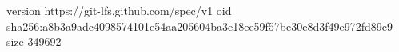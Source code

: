version https://git-lfs.github.com/spec/v1
oid sha256:a8b3a9adc4098574101e54aa205604ba3e18ee59f57be30e8d3f49e972fd89c9
size 349692
